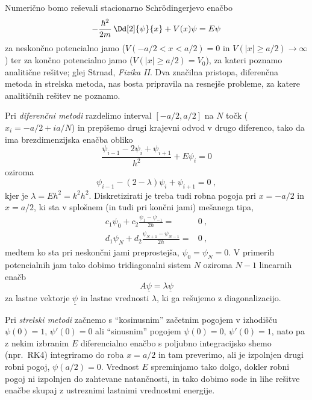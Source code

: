 \documentclass{article}
\begin{document}
Numerično bomo reševali stacionarno Schr\"odingerjevo enačbo
\begin{equation*}
-\frac{\hbar^2}{2m}\,\Dd[2]{\psi}{x} + V(x)\psi = E\psi  
\end{equation*}
za neskončno potencialno jamo ($V(-a/2 < x < a/2)=0$ 
in $V(|x|\ge a/2)\to\infty$) ter za končno potencialno jamo
($V(|x|\ge a/2)=V_0$), za kateri poznamo analitične rešitve;
glej Strnad, {\sl Fizika II\/}.  Dva značilna pristopa, diferenčna
metoda in strelska metoda, nas bosta pripravila na resnejše probleme,
za katere analitičnih rešitev ne poznamo.

Pri {\sl diferenčni metodi\/} razdelimo interval
$[-a/2,a/2]$ na $N$ točk ($x_i = -a/2 + ia/N$) in prepišemo drugi
krajevni odvod v drugo diferenco, tako da ima brezdimenzijska enačba obliko
\begin{equation*}
\frac{\psi_{i-1} - 2\psi_i + \psi_{i+1}}{h^2} + E\psi_i = 0  
\end{equation*}
oziroma
\begin{equation*}
\psi_{i-1} - (2-\lambda)\psi_i + \psi_{i+1} = 0 \>,  
\end{equation*}
kjer je $\lambda=Eh^2=k^2h^2$.  Diskretizirati je treba tudi robna
pogoja pri $x=-a/2$ in $x=a/2$, ki sta v splošnem (in tudi
pri končni jami) mešanega tipa,
\begin{align*}
c_1 \psi_0 + c_2 \frac{\psi_1 - \psi_{-1}}{2h} =& 0 \>, \\
d_1 \psi_N + d_2 \frac{\psi_{N+1} - \psi_{N-1}}{2h} =& 0 \>,
\end{align*}
medtem ko sta pri neskončni jami preprostejša, $\psi_0=\psi_N=0$.
V primerih potencialnih jam tako dobimo tridiagonalni sistem $N$
oziroma $N-1$ linearnih enačb
\begin{equation*}
A \underline{\psi} = \lambda \underline{\psi}   
\end{equation*}
za lastne vektorje $\underline{\psi}$ in lastne vrednosti $\lambda$,
ki ga rešujemo z diagonalizacijo.  

\smallskip

Pri {\sl strelski metodi\/} začnemo s ``kosinusnim'' začetnim pogojem
v izhodišču $\psi(0)=1$, $\psi'(0)=0$ ali ``sinusnim'' pogojem
$\psi(0)=0$, $\psi'(0)=1$, nato pa z nekim izbranim $E$ diferencialno
enačbo s poljubno integracijsko shemo (npr.~RK4) integriramo do roba
$x=a/2$ in tam preverimo, ali je izpolnjen drugi robni pogoj, $\psi(a/2)=0$.
Vrednost $E$ spreminjamo tako dolgo, dokler robni pogoj ni izpolnjen do
zahtevane natančnosti, in tako dobimo sode in lihe rešitve enačbe
skupaj z ustreznimi lastnimi vrednostmi energije.
\end{document}
